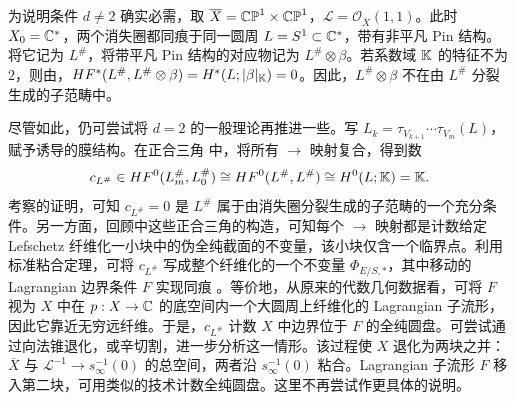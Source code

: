 \begin{note}\label{st:19.8}
为说明条件 $d\ne2$ 确实必需，取 $\overline X=\mathbb{CP}^1\times\mathbb{CP}^1$，$\mathcal L=\mathcal O_{\overline X}(1,1)$。此时 $X_0=\mathbb C^*$，两个消失圈都同痕于同一圆周 $L=S^1\subset\mathbb C^*$，带有非平凡 Pin 结构。将它记为 $L^\#$，将带平凡 Pin 结构的对应物记为 $L^\#\otimes\beta$。若系数域 $\mathbb K$ 的特征不为 $2$，则由，$HF^*(L^\#,L^\#\otimes\beta)=H^*(L;|\beta|_{\mathbb K})=0$。因此，$L^\#\otimes\beta$ 不在由 $L^\#$ 分裂生成的子范畴中。

尽管如此，仍可尝试将 $d=2$ 的一般理论再推进一些。写 $L_k=\tau_{V_{k+1}}\cdots\tau_{V_m}(L)$，赋予诱导的膜结构。在正合三角
中，将所有 $\to$ 映射复合，得到数
\[
c_{L^\#}\in HF^0(L_m^\#,L_0^\#)\cong HF^0(L^\#,L^\#)\cong H^0(L;\mathbb K)=\mathbb K.
\]
考察的证明，可知 $c_{L^\#}=0$ 是 $L^\#$ 属于由消失圈分裂生成的子范畴的一个充分条件。另一方面，回顾中这些正合三角的构造，可知每个 $\to$ 映射都是计数给定 Lefschetz 纤维化一小块中的伪全纯截面的不变量，该小块仅含一个临界点。利用标准粘合定理，可将 $c_{L^\#}$ 写成整个纤维化的一个不变量 $\Phi_{E/S,*}$，其中移动的 Lagrangian 边界条件 $F$ 实现同痕
。等价地，从原来的代数几何数据看，可将 $F$ 视为 $X$ 中在 $p:X\to\mathbb C$ 的底空间内一个大圆周上纤维化的 Lagrangian 子流形，因此它靠近无穷远纤维。于是，$c_{L^\#}$ 计数 $X$ 中边界位于 $F$ 的全纯圆盘。可尝试通过向法锥退化，或辛切割，进一步分析这一情形。该过程使 $X$ 退化为两块之并：$\overline X$ 与 $\mathcal L^{-1}\to s_\infty^{-1}(0)$ 的总空间，两者沿 $s_\infty^{-1}(0)$ 粘合。Lagrangian 子流形 $F$ 移入第二块，可用类似的技术计数全纯圆盘。这里不再尝试作更具体的说明。
\end{note}
